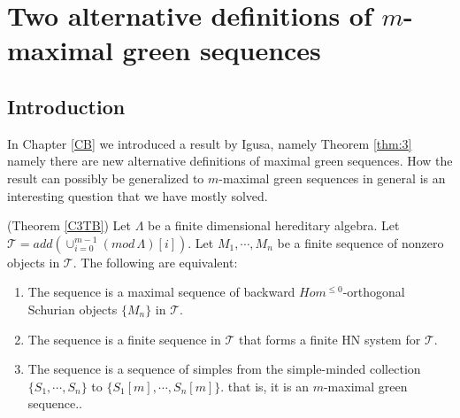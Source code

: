 \chapter{Two alternative definitions of $m$-maximal green sequences}\label{C3}
\section{Introduction}
\indent In Chapter \ref{CB} we introduced a result by Igusa, namely Theorem \ref{thm:3} namely there are new alternative definitions of maximal green sequences. How the result can possibly be generalized to $m$-maximal green sequences in general is an interesting question that we have mostly solved.\\
\begin{theorem}\label{C3T}
\indent (Theorem \ref{C3TB}) Let $\Lambda$ be a finite dimensional hereditary algebra. Let $\mathcal{T} = add(\cup_{i=0}^{m-1} (mod\,\Lambda)[i])$. Let $M_1,\cdots, M_n$ be a finite sequence of nonzero objects in $\mathcal{T}$. The following are equivalent:
\begin{enumerate}
\item The sequence is a maximal sequence of backward $Hom^{\leq 0}$-orthogonal Schurian objects $\{M_n\}$ in $\mathcal{T}$.
\item The sequence is a finite sequence in $\mathcal{T}$ that forms a finite HN system for $\mathcal{T}$.
\item The sequence is a sequence of simples from the simple-minded collection $\{S_1,\cdots, S_n\}$ to  $\{S_1[m],\cdots, S_n[m]\}$. that is, it is an $m$-maximal green sequence..
\end{enumerate}
\end{theorem}


